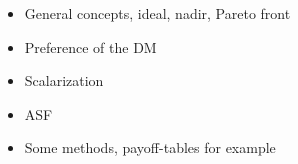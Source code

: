 \begin{itemize}
    \item General concepts, ideal, nadir, Pareto front
    \item Preference of the DM
    \item Scalarization
    \item ASF
    \item Some methods, payoff-tables for example
\end{itemize}